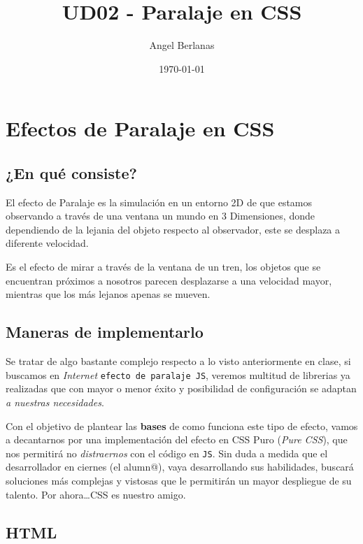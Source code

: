 \documentclass[11pt]{article}
\author{Angel Berlanas}
\date{\today}
\title{UD02 - Paralaje en CSS}
\begin{document}
\maketitle
\tableofcontents



\section{Efectos de Paralaje en CSS}
\label{sec-1}

\subsection{¿En qué consiste?}
\label{sec-1-1}

El efecto de Paralaje es la simulación en un entorno 2D de que estamos
observando a través de una ventana un mundo en 3 Dimensiones, donde dependiendo
de la lejania del objeto respecto al observador, este se desplaza a diferente
velocidad. 

Es el efecto de mirar a través de la ventana de un tren, los objetos que se
encuentran próximos a nosotros parecen desplazarse a una velocidad mayor,
mientras que los más lejanos apenas se mueven.

\subsection{Maneras de implementarlo}
\label{sec-1-2}

Se tratar de algo bastante complejo respecto a lo visto anteriormente en
clase, si buscamos en \emph{Internet} \verb~efecto de paralaje JS~, veremos multitud de
librerias ya realizadas que con mayor o menor éxito y posibilidad de
configuración se adaptan \emph{a nuestras necesidades}.

Con el objetivo de plantear las \textbf{bases} de como funciona este tipo de efecto,
vamos a decantarnos por una implementación del efecto en CSS Puro (\emph{Pure CSS}),
que nos permitirá no \emph{distraernos} con el código en \verb~JS~. Sin duda a medida que
el desarrollador en ciernes (el alumn@), vaya desarrollando sus habilidades,
buscará soluciones más complejas y vistosas que le permitirán un mayor
despliegue de su talento. Por ahora\ldots{}CSS es nuestro amigo.

\newpage
\subsection{HTML}
\label{sec-1-3}
\end{document}
